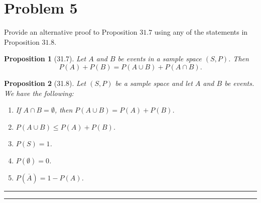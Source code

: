 \documentclass{article}
\newtheorem*{proposition}{Proposition} %
\theoremstyle{definition}
\newenvironment{solution}{\bigskip\hrule{\hfill}}{\bigskip\hrule{\hfill}} %
\begin{document}

\newpage


\section*{Problem 5}

Provide an alternative proof to Proposition $31.7$ using any of the statements in Proposition $31.8$.

\begin{proposition}[31.7]
    Let $A$ and $B$ be events in a sample space $\left(S,P\right)$. Then $$P\left(A\right)+P\left(B\right)=P\left(A\cup B\right)+P\left(A\cap B\right).$$
\end{proposition}
\begin{proposition}[31.8]
    Let $\left(S,P\right)$ be a sample space and let $A$ and $B$ be events. We have the following:
\begin{enumerate}[(1)] %
        \item If $A\cap B=\emptyset$, then $P\left(A\cup B\right)=P\left(A\right)+P\left(B\right)$.
        \item $P\left(A\cup B\right)\leq P\left(A\right)+P\left(B\right)$.
        \item $P\left(S\right)=1$.
        \item $P\left(\emptyset\right)=0$.
        \item $P\left(\overline{A}\right)=1-P\left(A\right)$.
    \end{enumerate}
\end{proposition}
\begin{solution}


\end{solution}


\newpage

\end{document}
